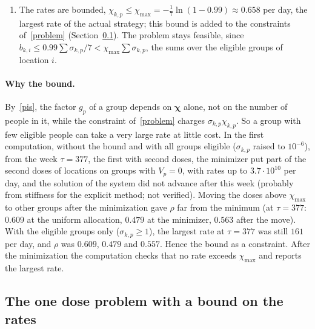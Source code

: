 \documentclass[11pt]{article}
\theoremstyle{plain}
\theoremstyle{remark}
\numberwithin{equation}{section}
\begin{document}
\begin{enumerate}
of the eigenvector strategy at the same state. One start is not enough: in a
55-week test run, the end values from the uniform start and from an
earlier second start, the doses in proportion to the left Perron vector of
$H_1\operatorname{diag}(\bm g)$ at the uniform allocation, differ by up to
$0.2\%$, each the smaller in about half of the weeks.
\item The rates are bounded, $\chi_{k,p}\le\chi_{\max}=-\frac17\ln(1-0.99)\approx0.658$
per day, the largest rate of the actual strategy; this bound is added to the
constraints of~\eqref{problem} (Section~\ref{sec-bound}). The problem stays
feasible, since $b_{k,i}\le0.99\sum\sigma_{k,p}/7<\chi_{\max}\sum\sigma_{k,p}$, the
sums over the eligible groups of location $i$.
\end{enumerate}

\paragraph{Why the bound.} By~\eqref{pis}, the factor $g_p$ of a group depends on
$\bm\chi$ alone, not on the number of people in it, while the constraint
of~\eqref{problem} charges $\sigma_{k,p}\chi_{k,p}$. So a group with few eligible
people can take a very large rate at little cost. In the first computation,
without the bound and with all groups eligible ($\sigma_{k,p}$ raised to $10^{-6}$),
from the week $\tau=377$, the first with second doses, the minimizer put part of
the second doses of locations on groups with $V_p=0$, with rates up to
$3.7\cdot10^{10}$ per day, and the solution of the system did not advance after
this week (probably from stiffness for the explicit method; not verified). Moving the doses above $\chi_{\max}$ to other groups after the
minimization gave $\rho$ far from the minimum (at $\tau=377$: $0.609$ at the
uniform allocation, $0.479$ at the minimizer, $0.563$ after the move). With the
eligible groups only ($\sigma_{k,p}\ge1$), the largest rate at $\tau=377$ was still
$161$ per day, and $\rho$ was $0.609$, $0.479$ and $0.557$. Hence the bound as a
constraint. After the minimization the computation checks that no rate exceeds
$\chi_{\max}$ and reports the largest rate.

\subsection{The one dose problem with a bound on the rates}\label{sec-bound}
\end{document}
